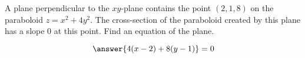 \documentclass{ximera}
\author{David Guichard \and Neal Koblitz \and H. Jerome Keisler \and Albert Scheller \and Barry Balof \and Mike Wills \and Matthew Carr}
\begin{document}
\begin{exercise}




A plane perpendicular to the $xy$-plane contains the point $(2,1,8)$ on the paraboloid $z=x^2+4y^2$. The cross-section of the paraboloid created by this plane has a slope $0$ at this point. Find an equation of the plane.

\begin{prompt}
\[
\answer{4(x-2)+8(y-1)}=0
\]
\end{prompt}


\end{exercise}
\end{document}
